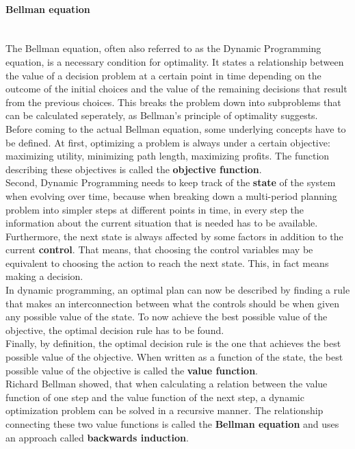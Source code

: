 \documentclass[conference]{IEEEtran}
\begin{document}
\paragraph{Bellman equation}
\quad \\
The Bellman equation, often also referred to as the Dynamic Programming equation, is a necessary condition for optimality.
It states a relationship between the value of a decision problem at a certain point in time depending on the outcome of the initial choices and the value of the remaining decisions that result from the previous choices. 
This breaks the problem down into subproblems that can be calculated seperately, as Bellman's principle of optimality suggests.\\
Before coming to the actual Bellman equation, some underlying concepts have to be defined.
At first, optimizing a problem is always under a certain objective: maximizing utility, minimizing path length, maximizing profits. The function describing these objectives is called the \textbf{objective function}.\\
Second, Dynamic Programming needs to keep track of the \textbf{state} of the system when evolving over time, because when breaking down a multi-period planning problem into simpler steps at different points in time, in every step the information about the current situation that is needed has to be available.\\
Furthermore, the next state is always affected by some factors in addition to the current \textbf{control}. That means, that choosing the control variables may be equivalent to choosing the action to reach the next state. This, in fact means making a decision.\\
In dynamic programming, an optimal plan can now be described by finding a rule that makes an interconnection between what the controls should be when given any possible value of the state. To now achieve the best possible value of the objective, the optimal decision rule has to be found.\\
Finally, by definition, the optimal decision rule is the one that achieves the best possible value of the objective. When written as a function of the state, the best possible value of the objective is called the \textbf{value function}.\\
Richard Bellman showed, that when calculating a relation between the value function of one step and the value function of the next step, a dynamic optimization problem can be solved in a recursive manner. The relationship connecting these two value functions is called the \textbf{Bellman equation} and uses an approach called \textbf{backwards induction}.\\
\end{document}
